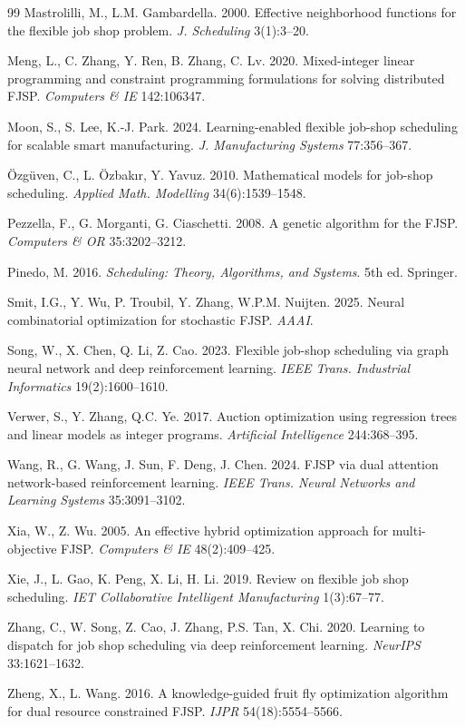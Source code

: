 \documentclass[conference]{IEEEtran}
\begin{document}
\begin{thebibliography}{99}
 Mastrolilli, M., L.M. Gambardella. 2000. Effective neighborhood functions for the flexible job shop problem. \textit{J. Scheduling} 3(1):3--20.

 Meng, L., C. Zhang, Y. Ren, B. Zhang, C. Lv. 2020. Mixed-integer linear programming and constraint programming formulations for solving distributed FJSP. \textit{Computers \& IE} 142:106347.

 Moon, S., S. Lee, K.-J. Park. 2024. Learning-enabled flexible job-shop scheduling for scalable smart manufacturing. \textit{J. Manufacturing Systems} 77:356--367.

 \"Ozg\"uven, C., L. \"Ozbak{\i}r, Y. Yavuz. 2010. Mathematical models for job-shop scheduling. \textit{Applied Math. Modelling} 34(6):1539--1548.

 Pezzella, F., G. Morganti, G. Ciaschetti. 2008. A genetic algorithm for the FJSP. \textit{Computers \& OR} 35:3202--3212.

 Pinedo, M. 2016. \textit{Scheduling: Theory, Algorithms, and Systems}. 5th ed. Springer.

 Smit, I.G., Y. Wu, P. Troubil, Y. Zhang, W.P.M. Nuijten. 2025. Neural combinatorial optimization for stochastic FJSP. \textit{AAAI}.

 Song, W., X. Chen, Q. Li, Z. Cao. 2023. Flexible job-shop scheduling via graph neural network and deep reinforcement learning. \textit{IEEE Trans. Industrial Informatics} 19(2):1600--1610.

 Verwer, S., Y. Zhang, Q.C. Ye. 2017. Auction optimization using regression trees and linear models as integer programs. \textit{Artificial Intelligence} 244:368--395.

 Wang, R., G. Wang, J. Sun, F. Deng, J. Chen. 2024. FJSP via dual attention network-based reinforcement learning. \textit{IEEE Trans. Neural Networks and Learning Systems} 35:3091--3102.

 Xia, W., Z. Wu. 2005. An effective hybrid optimization approach for multi-objective FJSP. \textit{Computers \& IE} 48(2):409--425.

 Xie, J., L. Gao, K. Peng, X. Li, H. Li. 2019. Review on flexible job shop scheduling. \textit{IET Collaborative Intelligent Manufacturing} 1(3):67--77.

 Zhang, C., W. Song, Z. Cao, J. Zhang, P.S. Tan, X. Chi. 2020. Learning to dispatch for job shop scheduling via deep reinforcement learning. \textit{NeurIPS} 33:1621--1632.

 Zheng, X., L. Wang. 2016. A knowledge-guided fruit fly optimization algorithm for dual resource constrained FJSP. \textit{IJPR} 54(18):5554--5566.

\end{thebibliography}
\end{document}
